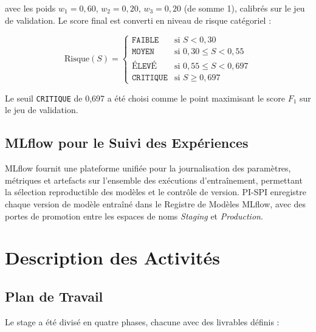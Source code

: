 \documentclass[12pt,a4paper,oneside]{book}
\theoremstyle{definition}
\theoremstyle{plain}
\begin{document}
avec les poids $w_1 = 0,60$, $w_2 = 0,20$, $w_3 = 0,20$ (de somme 1), calibrés sur le jeu de validation. Le score final est converti en niveau de risque catégoriel :

\begin{equation}
  \text{Risque}(S) =
  \begin{cases}
    \texttt{FAIBLE}   & \text{si } S < 0{,}30 \\
    \texttt{MOYEN}    & \text{si } 0{,}30 \leq S < 0{,}55 \\
    \texttt{ÉLEVÉ}    & \text{si } 0{,}55 \leq S < 0{,}697 \\
    \texttt{CRITIQUE} & \text{si } S \geq 0{,}697
  \end{cases}
  \label{eq:riskcat}
\end{equation}

Le seuil \texttt{CRITIQUE} de 0,697 a été choisi comme le point maximisant le score $F_1$ sur le jeu de validation.

\section{MLflow pour le Suivi des Expériences}

MLflow \citep{zaharia2018accelerating} fournit une plateforme unifiée pour la journalisation des paramètres, métriques et artefacts sur l'ensemble des exécutions d'entraînement, permettant la sélection reproductible des modèles et le contrôle de version. PI-SPI enregistre chaque version de modèle entraîné dans le Registre de Modèles MLflow, avec des portes de promotion entre les espaces de noms \textit{Staging} et \textit{Production}.

\chapter{Description des Activités}
\label{chap:activities}

\section{Plan de Travail}

Le stage a été divisé en quatre phases, chacune avec des livrables définis :
\end{document}
